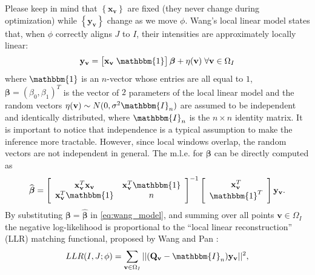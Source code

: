 Please keep in mind that $\left\lbrace\mathbf{x}_{\mathbf{v}}\right\rbrace$ are fixed (they never change during optimization) while $\left\lbrace\mathbf{y}_{\mathbf{v}}\right\rbrace$ change as we move $\phi$. Wang's local linear model states that, when $\phi$ correctly aligns $J$ to $I$, their intensities are approximately locally linear:
\begin{equation}\label{eq:wang_model}
    \mathbf{y}_{\mathbf{v}} = \left[\mathbf{x}_{\mathbf{v}} \; \mathbbm{1}\right]\boldsymbol{\beta} + \eta(\mathbf{v}) \; \forall \mathbf{v}\in\Omega_{I}
\end{equation}
where $\mathbbm{1}$ is an $n$-vector whose entries are all equal to $1$,  \hbox{$\boldsymbol{\beta} = (\beta_{0}, \beta_{1})^{T}$} is the vector of $2$ parameters of the local linear model and the random vectors $\eta(\mathbf{v})\sim N(0, \sigma^{2} \mathbbm{I}_{n})$ are assumed to be independent and identically distributed, where $\mathbbm{I}_{n}$ is the $n \times n$ identity matrix. It is important to notice that independence is a typical assumption to make the inference more tractable. However, since local windows overlap, the random vectors are not independent in general. The m.l.e. for $\boldsymbol{\beta}$ can be directly computed as
\begin{equation}\label{eq:wang_model_mle_beta}
    \widehat{\boldsymbol{\beta}} =
    \left[\begin{array}{cc}
        \mathbf{x}_{\mathbf{v}}^{T}\mathbf{x}_{\mathbf{v}} & \mathbf{x}_{\mathbf{v}}^{T}\mathbbm{1}\\
        \mathbf{x}_{\mathbf{v}}^{T}\mathbbm{1} & n
    \end{array}\right]^{-1}
    \left[\begin{array}{c}
        \mathbf{x}_{\mathbf{v}}^{T}\\
        \mathbbm{1}^{T}
    \end{array}\right]\mathbf{y}_{\mathbf{v}}.
\end{equation}
By substituting $\boldsymbol{\beta} = \widehat{\boldsymbol{\beta}}$ in \eqref{eq:wang_model}, and summing over all points $\mathbf{v} \in\Omega_{I}$ the negative log-likelihood is proportional to the ``local linear reconstruction'' (LLR) matching functional, proposed by Wang and Pan \cite{Wang2014}:
\begin{equation}\label{eq:wang_metric}
    LLR(I, J;\phi) = \sum_{\mathbf{v} \in\Omega_{I}}|| (\mathbf{Q}_{\mathbf{v}} - \mathbbm{I}_{n})\mathbf{y}_{\mathbf{v}}||^{2},
\end{equation}
